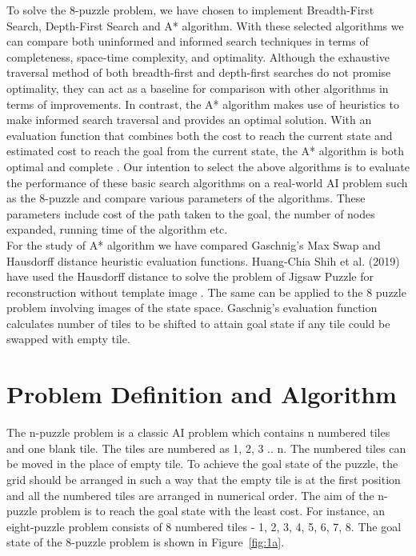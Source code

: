 \documentclass{svproc}
\begin{document}
\noindent To solve the 8-puzzle problem, we have chosen to implement Breadth-First Search, Depth-First Search and A* algorithm. With these selected algorithms we can compare both uninformed and informed search techniques in terms of completeness, space-time complexity, and optimality. Although the exhaustive traversal method of both breadth-first and depth-first searches do not promise optimality, they can act as a baseline for comparison with other algorithms in terms of improvements. In contrast, the A* algorithm makes use of heuristics to make informed search traversal and provides an optimal solution. With an evaluation function that combines both the cost to reach the current state and estimated cost to reach the goal from the current state, the A* algorithm is both optimal and complete \cite{rus}. Our intention to select the above algorithms is to evaluate the performance of these basic search algorithms on a real-world AI problem such as the 8-puzzle and compare various parameters of the algorithms. These parameters include cost of the path taken to the goal, the number of nodes expanded, running time of the algorithm etc.\\

\noindent For the study of A* algorithm we have compared Gaschnig’s Max Swap \cite{swa} and Hausdorff distance heuristic evaluation functions. Huang-Chia Shih et al. (2019) have used the Hausdorff distance to solve the problem of Jigsaw Puzzle for reconstruction without template image \cite{shi}. The same can be applied to the 8 puzzle problem involving images of the state space. Gaschnig's evaluation function calculates number of tiles to be shifted to attain goal state if any tile could be swapped with empty tile.

\section{Problem Definition and Algorithm}
 The n-puzzle problem is a classic AI problem which contains n numbered tiles and one blank tile. The tiles are numbered as 1, 2, 3 .. n. The numbered tiles can be moved in the place of empty tile. To achieve the goal state of the puzzle, the grid should be arranged in such a way that the empty tile is at the first position and all the numbered tiles are arranged in numerical order. The aim of the n-puzzle problem is to reach the goal state with the least cost. For instance, an eight-puzzle problem consists of 8 numbered tiles - 1, 2, 3, 4, 5, 6, 7, 8. The goal state of the 8-puzzle problem is shown in Figure~\ref{fig:1a}. \\
\end{document}
